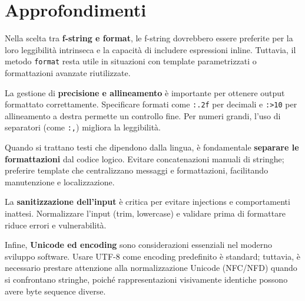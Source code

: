 \section{Approfondimenti}
\begin{tcolorbox}[title=Spiegazioni dettagliate]
Nella scelta tra \textbf{f-string e format}, le f-string dovrebbero essere preferite per la loro leggibilità intrinseca e la capacità di includere espressioni inline. Tuttavia, il metodo \verb|format| resta utile in situazioni con template parametrizzati o formattazioni avanzate riutilizzate.

La gestione di \textbf{precisione e allineamento} è importante per ottenere output formattato correttamente. Specificare formati come \verb|:.2f| per decimali e \verb|:>10| per allineamento a destra permette un controllo fine. Per numeri grandi, l'uso di separatori (come \verb|:,|) migliora la leggibilità.

Quando si trattano testi che dipendono dalla lingua, è fondamentale \textbf{separare le formattazioni} dal codice logico. Evitare concatenazioni manuali di stringhe; preferire template che centralizzano messaggi e formattazioni, facilitando manutenzione e localizzazione.

La \textbf{sanitizzazione dell'input} è critica per evitare injections e comportamenti inattesi. Normalizzare l'input (trim, lowercase) e validare prima di formattare riduce errori e vulnerabilità.

Infine, \textbf{Unicode ed encoding} sono considerazioni essenziali nel moderno sviluppo software. Usare UTF-8 come encoding predefinito è standard; tuttavia, è necessario prestare attenzione alla normalizzazione Unicode (NFC/NFD) quando si confrontano stringhe, poiché rappresentazioni visivamente identiche possono avere byte sequence diverse.
\end{tcolorbox}

